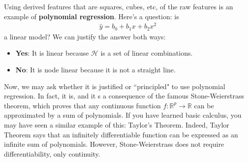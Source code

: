 \documentclass[12pt, a4paper]{article}
\theoremstyle{definition}
\begin{document}
	Using derived features that are squares, cubes, etc, of the raw features is an example
	of \textbf{polynomial regression}. Here's a question: is
	\begin{align*}
		\hat{y} = b_0 + b_1x + b_2 x^2
	\end{align*}
	a linear model? We can justify the answer both ways:
	\begin{itemize}
		\item \textbf{Yes}: It is linear because $\mathcal{H}$ is a set of linear combinations.
		\item \textbf{No}: It is node linear because it is not a straight line.
	\end{itemize}
	Now, we may ask whether it is justified or ``principled" to use polynomial regression.
	In fact, it is, and it s a consequence of the famous Stone-Weierstrass theorem, which
	proves that any continuous function $f:\mathbb{R}^p\to \mathbb{R}$ can be approximated
	by a sum of polynomials. If you have learned basic calculus, you may have seen a similar
	example of this: Taylor's Theorem. Indeed, Taylor Theorem says that an infinitely differentiable
	function can be expressed as an infinite sum of polynomials. However, Stone-Weierstrass
	does not require differentiability, only continuity.
	
\end{document}
